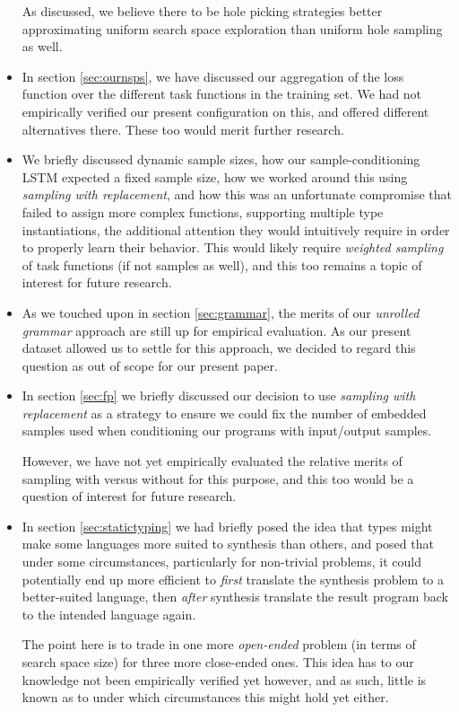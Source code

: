 \documentclass{article}
\begin{document}
\begin{itemize}
    As discussed, we believe there to be hole picking strategies better approximating uniform search space exploration than uniform hole sampling as well.
    \item In section \ref{sec:ournsps}, we have discussed our aggregation of
    the loss function over the different task functions in the training set.
    We had not empirically verified our present configuration on this,
    and offered different alternatives there.
    These too would merit further research.
    \item We briefly discussed dynamic sample sizes,
    how our sample-conditioning LSTM expected a fixed sample size,
    how we worked around this using \emph{sampling with replacement},
    and how this was an unfortunate compromise that failed to assign more complex functions,
    supporting multiple type instantiations,
    the additional attention they would intuitively require in order to properly learn their behavior.
    This would likely require \emph{weighted sampling} of task functions (if not samples as well),
    and this too remains a topic of interest for future research.
    \item As we touched upon in section \ref{sec:grammar},
    the merits of our \emph{unrolled grammar} approach are still up for empirical evaluation.
    As our present dataset allowed us to settle for this approach,
    we decided to regard this question as out of scope for our present paper.
    \item In section \ref{sec:fp} we briefly discussed our decision to use
    \emph{sampling with replacement} as a strategy to ensure we could fix
    the number of embedded samples used when conditioning our programs
    with input/output samples.

    However, we have not yet empirically evaluated the relative merits of
    sampling with versus without for this purpose,
    and this too would be a question of interest for future research.
    \item In section \ref{sec:statictyping} we had briefly posed the idea that types might make some languages more suited to synthesis than others,
    and posed that under some circumstances,
    particularly for non-trivial problems,
    it could potentially end up more efficient 
    to \emph{first} translate the synthesis problem to a better-suited language,
    then \emph{after} synthesis translate the result program back to the intended language again.

    The point here is to trade in one more \emph{open-ended} problem (in terms of search space size) for three more close-ended ones.
    This idea has to our knowledge not been empirically verified yet however,
    and as such, little is known as to under which circumstances this might hold yet either. 


\end{itemize}
\end{document}
